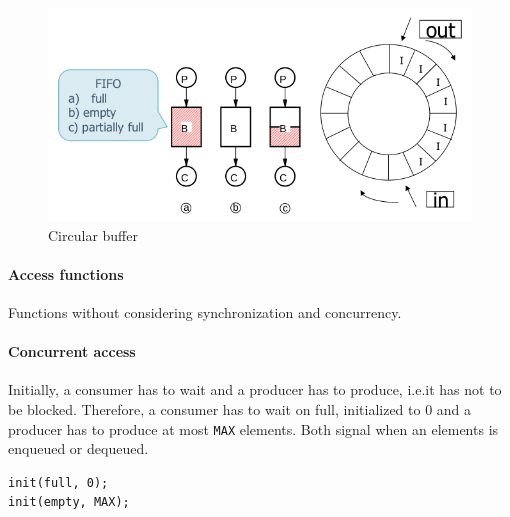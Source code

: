 \begin{figure}[hbtp]
\centering
\includegraphics[scale=0.4]{images/synchronization/producer_consumer_buffer.png}
\caption{Circular buffer}
\end{figure}

\paragraph{Access functions}
Functions without considering synchronization and concurrency.
\begin{Parallel}{}{}
\end{Parallel}

\paragraph{Concurrent access}
Initially, a consumer has to wait and a producer has to produce, i.e.\@ it has not to be blocked. Therefore, a consumer has to wait on full, initialized to 0 and a producer has to produce at most \texttt{MAX} elements. Both signal when an elements is enqueued or dequeued.
\begin{verbatim}
init(full, 0);
init(empty, MAX);
\end{verbatim}

\begin{Parallel}{}{}
\end{Parallel}

